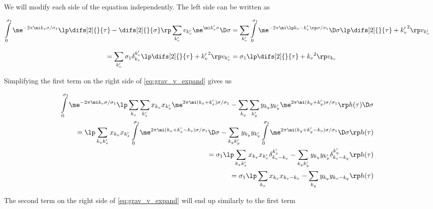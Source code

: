 \noindent
We will modify each side of the equation independently. The left side can be written as

\begin{equation}
\label{eq:grav_v_expand_left}
\begin{aligned}
    \int\limits_{0}^{\sigma_1} \me^{-2 \pi \mi k_v \sigma /\sigma_1} \lp \difs[2]{ }{\tau} - \difs[2]{ }{\sigma} \rp \sum\limits_{k_v'} v_{k_v'} \me^{\mi k_v' \sigma} \D \sigma
    &= \sum\limits_{k_v'} \int\limits_{0}^{\sigma_1} \me^{-2 \pi \mi \lp k_v - k_v' \rp \sigma /\sigma_1} \D \sigma \lp \difs[2]{ }{\tau} + {k_v'}^2  \rp v_{k_v'} \\[3mm]
    = \sum\limits_{k_v'} \sigma_1 \delta^{k_v'}_{k_v} \lp \difs[2]{ }{\tau} + {k_v'}^2  \rp v_{k_v'} 
    &= \sigma_1 \lp \difs[2]{ }{\tau} + {k_v}^2  \rp v_{k_v}
\end{aligned}
\end{equation}

\noindent
Simplifying the first term on the right side of \cref{eq:grav_v_expand} gives us

\begin{equation}
\label{eq:grav_v_expand_right1}
\begin{aligned}
    \int\limits_{0}^{\sigma_1} \me^{-2 \pi \mi k_v \sigma /\sigma_1} 
    \lp \sum\limits_{k_x} \sum\limits_{k_x'} x_{k_x} x_{k_x'} \me^{2 \pi\mi (k_x + k_x') \sigma /\sigma_1}
    - \sum\limits_{k_y} \sum\limits_{k_y'} y_{k_y} y_{k_y'} \me^{2 \pi\mi (k_y + k_y') \sigma /\sigma_1} \rp 
    h(\tau) \D \sigma \\
    = \lp \sum\limits_{k_x k_x'} x_{k_x} x_{k_x'} \int\limits_{0}^{\sigma_1} \me^{2 \pi \mi (k_x + k_x' - k_v) \sigma /\sigma_1} \D \sigma
    - \sum\limits_{k_y k_y'} y_{k_y} y_{k_y'} \int\limits_{0}^{\sigma_1} \me^{2 \pi \mi (k_y + k_y' - k_v) \sigma /\sigma_1} \D \sigma \rp 
    h(\tau) \\
    = \sigma_1 \lp \sum\limits_{k_x k_x'} x_{k_x} x_{k_x'} \delta^{k_x'}_{k_v - k_x}
    - \sum\limits_{k_y k_y'} y_{k_y} y_{k_y'} \delta^{k_y'}_{k_v - k_y} \rp 
    h(\tau) \\
    = \sigma_1 \lp \sum\limits_{k_x} x_{k_x} x_{k_v - k_x} - \sum\limits_{k_y} y_{k_y} y_{k_v - k_y} \rp h(\tau)
\end{aligned}
\end{equation}

\noindent
The second term on the right side of \cref{eq:grav_v_expand} will end up similarly to the first term

